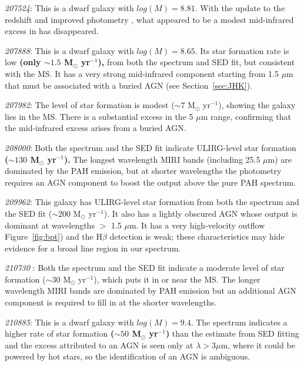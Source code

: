 \documentclass[twocolumn]{aastex63}
\begin{document}
{ {\it 207524}: This is a dwarf galaxy with $log(M) = 8.81$. With the update to the redshift and improved photometry \citep{Alberts2024}, what appeared to be a modest mid-infrared excess in \citet{Lyu2024} has disappeared. 

{\it 207888}: This is a dwarf galaxy with $log(M) = 8.65$. Its star formation rate is low {\bf (only $\sim 1.5$ M$_\odot$ yr$^{-1}$),} from both the spectrum and SED fit, but consistent with the MS. It has a very strong mid-infrared component starting from 1.5
$\mu$m that must be associated with a buried AGN  (see Section~\ref{sec:JHK}).

{\it 207982}: The level of star formation is modest  ($\sim 7$ M$_\odot$ yr$^{-1}$), showing the galaxy lies in the MS. There is a substantial excess in the 5 $\mu$m range, confirming that the mid-infrared excess arises from a buried AGN.

{\it 208000}: Both the spectrum and the SED fit indicate ULIRG-level star formation {\bf ($\sim 130$ M$_\odot$ yr$^{-1}$).} The longest wavelength MIRI bands  (including 25.5 $\mu$m) are dominated by the PAH emission, but at shorter wavelengths the photometry requires an AGN component to boost the output above the pure PAH spectrum.

{\it 209962}: This galaxy  has ULIRG-level star formation from both the spectrum and the SED fit ($\sim 200$ M$_\odot$ yr$^{-1}$). It also has a lightly obscured AGN whose output is dominant at wavelengths $>$ 1.5 $\mu$m. It has a very high-velocity outflow \citep{Zhu2025}  Figure~\ref{fig:bpt}) and the H$\beta$ detection is weak; these characteristics may hide evidence for a broad line region in our spectrum.

{\it 210730 }: Both the spectrum and the SED fit indicate a moderate level of star formation  ($\sim 30$ M$_\odot$ yr$^{-1}$), which puts it in or near the MS. The longer wavelength MIRI bands are dominated by PAH emission but an additional AGN component is required to fill in at the shorter wavelengths.

{\it 210885}: This is a dwarf galaxy with $log(M) = 9.4$. The spectrum indicates a higher rate of star formation {\bf ($\sim 50$ M$_\odot$ yr$^{-1}$)} than the estimate from SED fitting and the excess attributed to an AGN is seen only at $\lambda > 3 \mu$m, where it could be powered by hot stars, so the identification of an AGN is ambiguous. 

}
\end{document}
